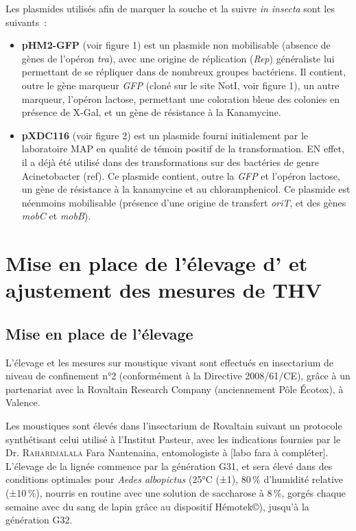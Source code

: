 Les plasmides utilisés afin de marquer la souche et la suivre \textit{in insecta} sont les suivants~:
\begin{itemize}
\item \textbf{pHM2-GFP} (voir figure 1) est un plasmide non mobilisable (absence de gènes de l'opéron \textit{tra}), avec une origine de réplication (\textit{Rep}) généraliste lui permettant de se répliquer dans de nombreux groupes bactériens. Il contient, outre le gène marqueur \textit{GFP} (cloné sur le site NotI, voir figure 1), un autre marqueur, l'opéron lactose, permettant une coloration bleue des colonies en présence de X-Gal, et un gène de résistance à la Kanamycine.
\cite{favia2007}
\item \textbf{pXDC116} (voir figure 2) est un plasmide fourni initialement par le laboratoire MAP en qualité de témoin positif de la transformation. EN effet, il a déjà été utilisé dans des transformations sur des bactéries de genre Acinetobacter (ref).
Ce plasmide contient, outre la \textit{GFP} et l'opéron lactose, un gène de résistance à la kanamycine et au chloramphenicol. Ce plasmide est néenmoins mobilisable (présence d'une origine de transfert \textit{oriT}, et des gènes \textit{mobC} et \textit{mobB}).
\end{itemize}


\section{Mise en place de l'élevage d' et ajustement des mesures de THV}

\subsection{Mise en place de l'élevage}

L'élevage et les mesures sur moustique vivant sont effectués en insectarium de niveau de confinement n°2 (conformément à la Directive 2008/61/CE), grâce à un partenariat avec la Rovaltain Research Company (anciennement Pôle Écotox), à Valence.

Les moustiques sont élevés dans l'insectarium de Rovaltain suivant un protocole synthétisant celui utilisé à l'Institut Pasteur, avec les indications fournies par le Dr. \textsc{Raharimalala} Fara Nantenaina, entomologiste à [labo fara à compléter].
L'élevage de la lignée commence par la génération G31, et sera élevé dans des conditions optimales pour \textit{Aedes albopictus} (25°C (±1), 80\,\% d'humidité relative (±10\,\%), nourris en routine avec une solution de saccharose à 8\,\%, gorgés chaque semaine avec du sang de lapin grâce au dispositif Hémotek©), jusqu'à la génération G32.

